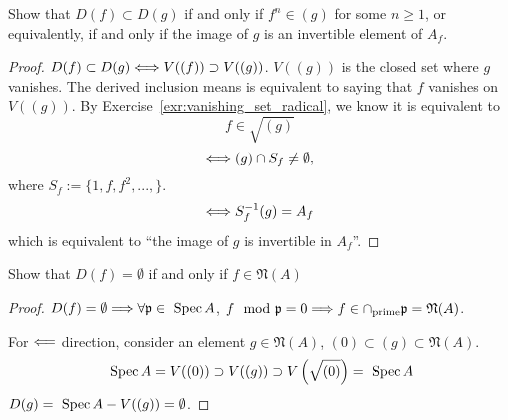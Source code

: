 \begin{exr}\label{chap3exr:inclusion_distinguished_open}
Show that $D(f) \subset D(g)$ if and
only if $f^n \in(g)$ for some $n\geq 1$, or equivalently, if and  only if the image of $g$ is an invertible element of $A_f$.
\end{exr}
\begin{proof}
$D(f)\subset D(g)\Longleftrightarrow V((f))\supset V((g))$. $V((g))$ is the closed set where $g$ vanishes. The derived inclusion means is equivalent to saying that $f$ vanishes on $V((g))$. By Exercise~\ref{exr:vanishing_set_radical}, we know it is equivalent to 
$$
f\in \sqrt{(g)}
$$
$$
\Longleftrightarrow (g)\cap S_f\neq \emptyset,
$$
where $S_f:=\{1,f,f^2,...,\}$.
$$
\Longleftrightarrow S_f^{-1}(g)=A_f
$$
which is equivalent to ``the image of $g$ is invertible in $A_f$''.
\end{proof}

\begin{exr}\label{chap3exr:3.5.F}
Show that $D(f) = \emptyset$ if and only if $f\in \mathfrak{N}(A)$
\end{exr}
\begin{proof}
$D(f) = \emptyset\Longrightarrow \forall {\mathfrak p}\in \text{ Spec\,} A$, $f\mod{{\mathfrak p}}=0\Longrightarrow f\in \cap_{\text{prime}}{\mathfrak p}=\mathfrak{N}(A)$.

For $\Longleftarrow$ direction, consider an element $g\in \mathfrak{N}(A)$,  $(0)\subset (g)\subset \mathfrak{N}(A)$. 
$$
\text{ Spec\,} A=V((0))\supset V((g))\supset V\left(\sqrt{(0)}\right)=\text{ Spec\,} A
$$
 $D(g)=\text{ Spec\,} A- V((g))=\emptyset$.
\end{proof}

